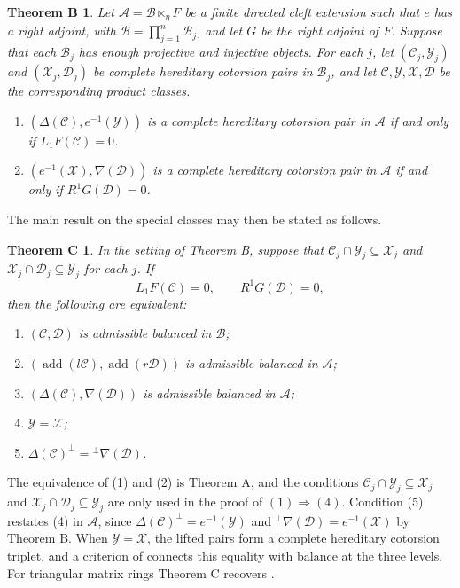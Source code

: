 \documentclass[11pt]{amsart}
\theoremstyle{definition}
\theoremstyle{remark}
\theoremstyle{plain}
\newtheorem*{theoremB}{Theorem B}
\newtheorem*{theoremC}{Theorem C}
\numberwithin{equation}{section}
\begin{document}
\begin{theoremB}
Let $\mathcal{A} = \mathcal{B} \ltimes_\eta F$ be a finite directed cleft extension such that
$e$ has a right adjoint, with $\mathcal{B} = \prod_{j = 1}^n\mathcal{B}_j$, and let $G$ be the
right adjoint of $F$. Suppose that each $\mathcal{B}_j$ has
enough projective and injective objects. For each $j$, let
$(\mathcal{C}_j, \mathcal{Y}_j)$ and $(\mathcal{X}_j, \mathcal{D}_j)$ be complete hereditary cotorsion pairs
in $\mathcal{B}_j$, and let $\mathcal{C}, \mathcal{Y}, \mathcal{X}, \mathcal{D}$ be the corresponding product classes.
\begin{enumerate}
 \item $(\Delta(\mathcal{C}), e^{-1}(\mathcal{Y}))$ is a complete hereditary cotorsion pair
 in $\mathcal{A}$ if and only if $L_1F(\mathcal{C}) = 0$.
 \item $(e^{-1}(\mathcal{X}), \nabla(\mathcal{D}))$ is a complete hereditary cotorsion pair
 in $\mathcal{A}$ if and only if $R^1G(\mathcal{D}) = 0$.
\end{enumerate}
\end{theoremB}

The main result on the special classes may then be stated as follows.

\begin{theoremC}
In the setting of Theorem B, suppose that
$\mathcal{C}_j \cap \mathcal{Y}_j \subseteq \mathcal{X}_j$ and $\mathcal{X}_j \cap \mathcal{D}_j \subseteq \mathcal{Y}_j$
for each $j$. If
\[
 L_1F(\mathcal{C}) = 0, \qquad R^1G(\mathcal{D}) = 0,
\]
then the following are equivalent:
\begin{enumerate}
 \item $(\mathcal{C}, \mathcal{D})$ is admissible balanced in $\mathcal{B}$;
 \item $(\operatorname{add}(l\mathcal{C}), \operatorname{add}(r\mathcal{D}))$ is admissible balanced in $\mathcal{A}$;
 \item $(\Delta(\mathcal{C}), \nabla(\mathcal{D}))$ is admissible balanced in $\mathcal{A}$;
 \item $\mathcal{Y} = \mathcal{X}$;
 \item $\Delta(\mathcal{C})^\perp = {}^\perp\nabla(\mathcal{D})$.
\end{enumerate}
\end{theoremC}

The equivalence of (1) and (2) is Theorem A, and the conditions
$\mathcal{C}_j \cap \mathcal{Y}_j \subseteq \mathcal{X}_j$ and $\mathcal{X}_j \cap \mathcal{D}_j \subseteq \mathcal{Y}_j$ are
only used in the proof of $(1) \Rightarrow (4)$. Condition (5) restates (4) in
$\mathcal{A}$, since $\Delta(\mathcal{C})^\perp = e^{-1}(\mathcal{Y})$ and
${}^\perp\nabla(\mathcal{D}) = e^{-1}(\mathcal{X})$ by Theorem B. When $\mathcal{Y} = \mathcal{X}$, the
lifted pairs form a complete hereditary cotorsion triplet, and a
criterion of \cite{EPZ} connects this equality with balance at the three
levels. For triangular matrix rings Theorem C recovers \cite[Theorem~2.5]{Mao}.
\end{document}
